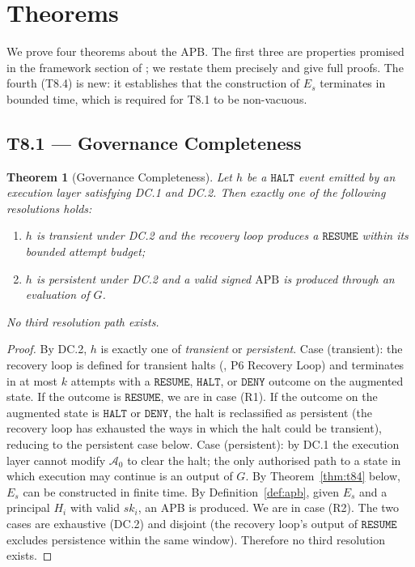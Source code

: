 \documentclass[11pt]{article}
\newtheorem{theorem}{Theorem}[section]
\newcommand{\Azero}{\mathcal{A}_0}
\newcommand{\HALT}{\texttt{HALT}}
\newcommand{\RESUME}{\texttt{RESUME}}
\newcommand{\DENY}{\texttt{DENY}}
\newcommand{\Es}{E_s}
\newcommand{\Hi}{H_i}
\newcommand{\ski}{sk_i}
\newcommand{\APB}{\mathrm{APB}}
\begin{document}
\section{Theorems}
\label{sec:theorems}

We prove four theorems about the APB. The first three are
properties promised in the framework section of
\citep{fernandez2026applied}; we restate them precisely and give full
proofs. The fourth (T8.4) is new: it establishes that the construction
of $\Es$ terminates in bounded time, which is required for T8.1 to be
non-vacuous.

\subsection{T8.1 --- Governance Completeness}
\label{sec:t81}

\begin{theorem}[Governance Completeness]
\label{thm:completeness}
Let $h$ be a $\HALT$ event emitted by an execution layer satisfying
DC.1 and DC.2. Then exactly one of the following resolutions holds:
\begin{enumerate}[leftmargin=2em, topsep=2pt, itemsep=1pt]
  \item[(R1)] $h$ is transient under DC.2 and the recovery loop
        produces a $\RESUME$ within its bounded attempt budget;
  \item[(R2)] $h$ is persistent under DC.2 and a valid signed
        $\APB$ is produced through an evaluation of $G$.
\end{enumerate}
No third resolution path exists.
\end{theorem}

\begin{proof}
By DC.2, $h$ is exactly one of \emph{transient} or \emph{persistent}.
Case (transient): the recovery loop is defined for transient halts
(\citep{fernandez2026applied}, P6 Recovery Loop) and terminates in at
most $k$ attempts with a $\RESUME$, $\HALT$, or $\DENY$ outcome on the
augmented state. If the outcome is $\RESUME$, we are in case (R1).
If the outcome on the augmented state is $\HALT$ or $\DENY$, the halt
is reclassified as persistent (the recovery loop has exhausted the
ways in which the halt could be transient), reducing to the persistent
case below.
Case (persistent): by DC.1 the execution layer cannot modify $\Azero$
to clear the halt; the only authorised path to a state in which
execution may continue is an output of $G$. By Theorem~\ref{thm:t84}
below, $\Es$ can be constructed in finite time. By
Definition~\ref{def:apb}, given $\Es$ and a principal $\Hi$ with valid
$\ski$, an APB is produced. We are in case (R2).
The two cases are exhaustive (DC.2) and disjoint (the recovery loop's
output of $\RESUME$ excludes persistence within the same window).
Therefore no third resolution exists.
\end{proof}
\end{document}
